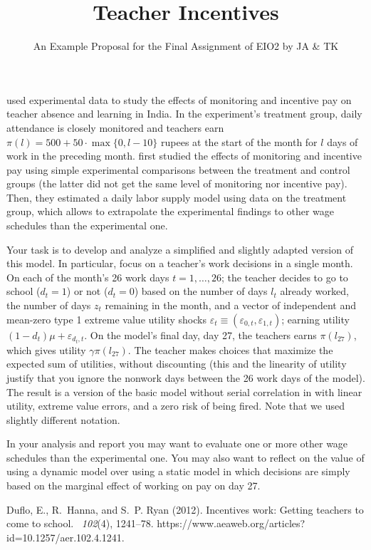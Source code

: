 \documentclass[fleqn,12pt]{article}
\title{Teacher Incentives}
\author{An Example Proposal for the Final Assignment of EIO2 by JA \& TK}
\date{}
\begin{document}
\maketitle

\citet{aer12:dufloetal} used experimental data to study the effects of monitoring and incentive pay on teacher absence and learning in India. In the experiment's treatment group, daily attendance is closely monitored and teachers earn $\pi(l)=500+50\cdot\max\{0,l-10\}$ rupees at the start of the month for $l$ days of work in the preceding month. \citeauthor{aer12:dufloetal} first studied the effects of monitoring and incentive pay using simple experimental comparisons between the treatment and control groups (the latter did not get the same level of monitoring nor incentive pay). Then, they estimated a daily labor supply model using data on the treatment group, which allows to extrapolate the experimental findings to other wage schedules than the experimental one. 

Your task is to develop and analyze a simplified and slightly adapted version of this model. In particular, focus on a teacher's work decisions in a single month. On each of the month's 26 work days $t=1,\ldots,26$; the teacher decides to go to school ($d_t=1$) or not ($d_t=0$) based on the number of days $l_t$ already worked, the number of days $z_t$ remaining in the month, and a vector of independent and mean-zero type 1 extreme value utility shocks $\varepsilon_t\equiv(\varepsilon_{0,t},\varepsilon_{1,t})$; earning utility $(1-d_t)\mu+\varepsilon_{d_t,t}$. On the model's final day, day 27, the teachers earns $\pi(l_{27})$, which gives utility $\gamma\pi(l_{27})$.  The teacher makes choices that maximize the expected sum of utilities, without discounting (this and the linearity of utility justify that you ignore the nonwork days between the 26 work days of the model). The result is a version of the basic model without serial correlation in \citet[][Section III]{aer12:dufloetal} with linear utility, extreme value errors, and a zero risk of being fired. Note that we used slightly different notation.

In your analysis and report you may want to evaluate one or more other wage schedules than the experimental one. You may also want to reflect on the value of using a dynamic model over  using a static model in which decisions are simply based on the marginal effect of working on pay on day 27. 

\begin{thebibliography}{}

Duflo, E., R.~Hanna, and S.~P. Ryan (2012).
\newblock Incentives work: Getting teachers to come to school.
~{\em 102\/}(4), 1241--78.
\newblock https://www.aeaweb.org/articles?id=10.1257/aer.102.4.1241.

\end{thebibliography}
\end{document}
